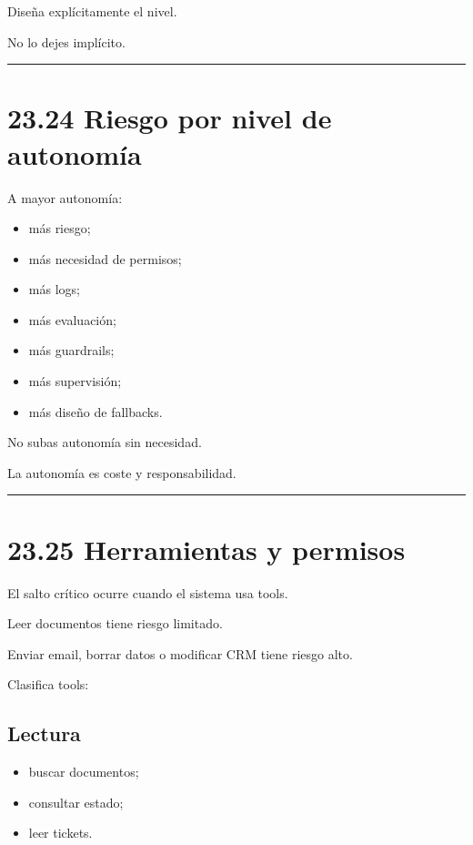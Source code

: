 Diseña explícitamente el nivel.

No lo dejes implícito.

\begin{center}\rule{0.5\linewidth}{0.5pt}\end{center}

\section{23.24 Riesgo por nivel de
autonomía}\label{riesgo-por-nivel-de-autonomuxeda}

A mayor autonomía:

\begin{itemize}
\tightlist
\item
  más riesgo;
\item
  más necesidad de permisos;
\item
  más logs;
\item
  más evaluación;
\item
  más guardrails;
\item
  más supervisión;
\item
  más diseño de fallbacks.
\end{itemize}

No subas autonomía sin necesidad.

La autonomía es coste y responsabilidad.

\begin{center}\rule{0.5\linewidth}{0.5pt}\end{center}

\section{23.25 Herramientas y permisos}\label{herramientas-y-permisos}

El salto crítico ocurre cuando el sistema usa tools.

Leer documentos tiene riesgo limitado.

Enviar email, borrar datos o modificar CRM tiene riesgo alto.

Clasifica tools:

\subsection{Lectura}\label{lectura}

\begin{itemize}
\tightlist
\item
  buscar documentos;
\item
  consultar estado;
\item
  leer tickets.
\end{itemize}

